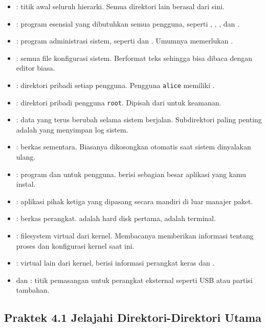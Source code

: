 \begin{itemize}
    \item \dir{/} : titik awal seluruh hierarki. Semua direktori lain berasal dari sini.
    \item {} : program esensial yang dibutuhkan semua pengguna, seperti , , , dan .
    \item {} : program administrasi sistem, seperti  dan . Umumnya memerlukan .
    \item {} : semua file konfigurasi sistem. Berformat teks sehingga bisa dibaca dengan editor biasa.
    \item {} : direktori pribadi setiap pengguna. Pengguna \texttt{alice} memiliki .
    \item {} : direktori pribadi pengguna \texttt{root}. Dipisah dari  untuk keamanan.
    \item {} : data yang terus berubah selama sistem berjalan. Subdirektori paling penting adalah  yang menyimpan log sistem.
    \item {} : berkas sementara. Biasanya dikosongkan otomatis saat sistem dinyalakan ulang.
    \item {} : program dan  untuk pengguna.  berisi sebagian besar aplikasi yang kamu instal.
    \item {} : aplikasi pihak ketiga yang dipasang secara mandiri di luar manajer paket.
    \item {} : berkas perangkat.  adalah hard disk pertama,  adalah terminal.
    \item {} : filesystem virtual dari kernel. Membacanya memberikan informasi tentang proses dan konfigurasi kernel saat ini.
    \item {} :  virtual lain dari kernel, berisi informasi perangkat keras dan .
    \item {} dan  : titik pemasangan untuk perangkat eksternal seperti USB atau partisi tambahan.
\end{itemize}

\subsection*{Praktek 4.1 Jelajahi Direktori-Direktori Utama}


